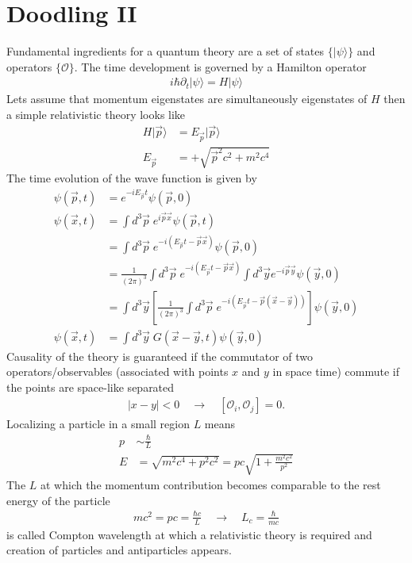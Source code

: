 \documentclass[10pt,a4paper]{article}
\theoremstyle{definition}
\begin{document}
\section{Doodling II}
Fundamental ingredients for a quantum theory are a set of states $\{|\psi\rangle\}$ and operators $\{\mathcal{O}\}$. The time development is governed by a Hamilton operator
\begin{align}
    i\hbar\partial_t|\psi\rangle=H|\psi\rangle
\end{align}
Lets assume that momentum eigenstates are simultaneously eigenstates of $H$ then a simple relativistic theory looks like
\begin{align}
    H|\vec{p}\rangle&= E_{\vec{p}}|\vec{p}\rangle\\
    E_{\vec{p}}&=+\sqrt{\vec{p}^2c^2+m^2c^4}
\end{align}
The time evolution of the wave function is given by
\begin{align}
    \psi(\vec{p},t) &= e^{-iE_{\vec{p}} t} \psi(\vec{p},0)\\
    \psi(\vec{x},t) &= \int d^3\vec{p}\;e^{i\vec{p}\vec{x}}\psi(\vec{p},t)\\
    &=\int d^3\vec{p}\;e^{-i(E_{\vec{p}} t-\vec{p}\vec{x})}\psi(\vec{p},0)\\
    &=\frac{1}{(2\pi)^3}\int d^3\vec{p}\;e^{-i(E_{\vec{p}} t-\vec{p}\vec{x})}\int d^3\vec{y}e^{-i\vec{p}\vec{y}}\psi(\vec{y},0)\\
    &=\int d^3\vec{y}\left[\frac{1}{(2\pi)^3}\int d^3\vec{p}\;e^{-i(E_{\vec{p}} t-\vec{p}(\vec{x}-\vec{y}))}\right]\psi(\vec{y},0)\\
    \psi(\vec{x},t) &= \int d^3\vec{y}\;G(\vec{x}-\vec{y},t) \psi(\vec{y},0)
\end{align}
Causality of the theory is guaranteed if the commutator of two operators/observables (associated with points $x$ and $y$ in space time) commute if the points are space-like separated
\begin{align}
    |x-y|<0\quad\rightarrow\quad [\mathcal{O}_i,\mathcal{O}_j]=0.
\end{align}
Localizing a particle in a small region $L$ means
\begin{align}
    p&\sim\frac{\hbar}{L}\\
    E&=\sqrt{m^2c^4+p^2c^2}= pc\sqrt{1+\frac{m^2c^2}{p^2}}
\end{align}
The $L$ at which the momentum contribution becomes comparable to the rest energy of the particle
\begin{align}
    mc^2=pc = \frac{\hbar c}{L}\quad\rightarrow\quad L_c=\frac{\hbar}{mc}
\end{align}
is called Compton wavelength at which a relativistic theory is required and creation of particles and antiparticles appears.
\end{document}
